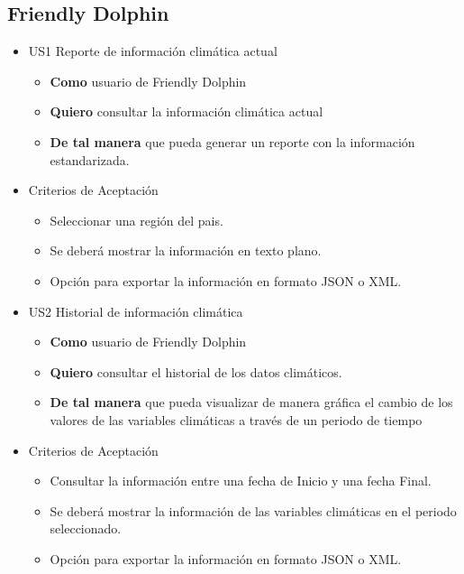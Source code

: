 \subsection*{Friendly Dolphin}
  \begin{itemize}
    \item US1 Reporte de información climática actual
    \begin{itemize}
      \item \textbf{Como} usuario de Friendly Dolphin
      \item \textbf{Quiero} consultar la información climática actual
      \item \textbf{De tal manera} que pueda generar un reporte con la información estandarizada.
    \end{itemize}
    \item Criterios de Aceptación
    \begin{itemize}
      \item Seleccionar una región del pais.
      \item Se deberá mostrar la información en texto plano.
      \item Opción para exportar la información en formato JSON o XML.
    \end{itemize}
  \end{itemize}
  \begin{itemize}
    \item US2 Historial de información climática
    \begin{itemize}
      \item \textbf{Como} usuario de Friendly Dolphin
      \item \textbf{Quiero} consultar el historial de los datos climáticos.
      \item \textbf{De tal manera} que pueda visualizar de manera gráfica el cambio de los valores de las variables climáticas a través de un periodo de tiempo
    \end{itemize}
    \item Criterios de Aceptación
    \begin{itemize}
      \item Consultar la información entre una fecha de Inicio y una fecha Final.
      \item Se deberá mostrar la información de las variables climáticas en el periodo seleccionado.
      \item Opción para exportar la información en formato JSON o XML.
    \end{itemize}
  \end{itemize}
